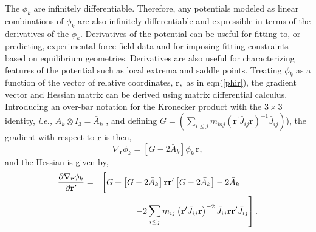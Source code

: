 \documentclass[12pt,thmsa]{article}
\begin{document}
The $\phi _k$ are infinitely differentiable. Therefore, any potentials
modeled as linear combinations of $\phi _k$ are also infinitely
differentiable and expressible in terms of the derivatives of the $\phi _k$.
Derivatives of the potential can be useful for fitting to, or predicting,
experimental force field data and for imposing fitting constraints based on
equilibrium geometries. Derivatives are also useful for characterizing
features of the potential such as local extrema and saddle points. Treating $%
\phi _k$ as a function of the vector of relative coordinates, $\mathbf{r,}$
as in eqn(\ref{phir}), the gradient vector and Hessian matrix can be derived
using matrix differential calculus\cite{Kinghorn95a}. Introducing an
over-bar notation for the Kronecker product with the $3\times 3$ identity, 
\textit{i.e.,} $A_k\otimes I_3=\bar{A}_k\,\,$, and defining $G=\left(
\sum_{i\leq j}m_{kij}\left( \mathbf{r}^{\prime }\bar{J}_{ij}\mathbf{r}%
\right) ^{-1}\bar{J}_{ij}\right) $), the gradient with respect to $\mathbf{r}
$ is then, 
\begin{equation}
\nabla _{\mathbf{r}}\phi _k=\left[ G-2\bar{A}_k\right] \phi _k\,\mathbf{r,}
\end{equation}
and the Hessian is given by, 
\begin{eqnarray}
\frac{\partial \nabla _{\mathbf{r}}\phi _k}{\partial \mathbf{r}^{\prime }}
&=&\left[ G+\left[ G-2\bar{A}_k\right] \mathbf{rr}^{\prime }\left[ G-2\bar{A}%
_k\right] -2\bar{A}_k\mathstrut \strut 
\begin{array}{ll}
&  \\ 
& 
\end{array}
\right.   \nonumber \\
&&\left. -2\sum_{i\leq j}m_{ij}\left( \mathbf{r}^{\prime }\bar{J}_{ij}%
\mathbf{r}\right) ^{-2}\bar{J}_{ij}\mathbf{rr}^{\prime }\bar{J}_{ij}\right] .
\end{eqnarray}
\end{document}
